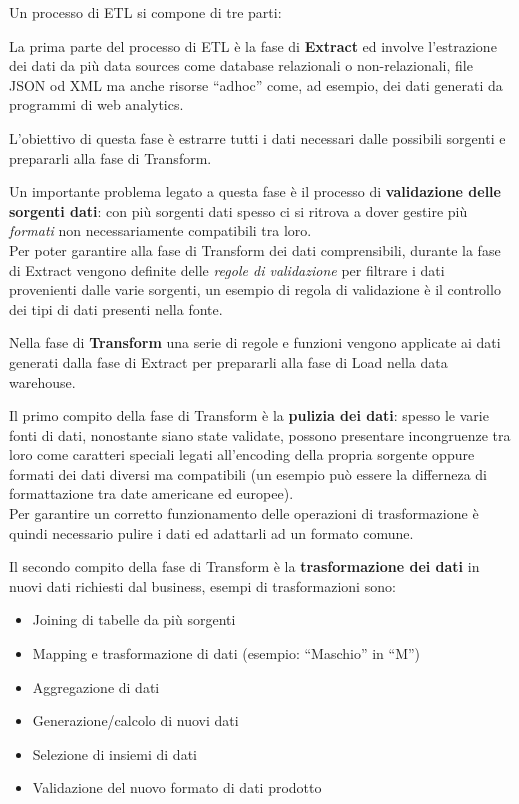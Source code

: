 \documentclass[]{article}
\providecommand{\tightlist}{%
  \setlength{\itemsep}{0pt}\setlength{\parskip}{0pt}}
\begin{document}
Un processo di ETL si compone di tre parti:

La prima parte del processo di ETL è la fase di \textbf{Extract} ed
involve l'estrazione dei dati da più data sources come database
relazionali o non-relazionali, file JSON od XML ma anche risorse
``adhoc'' come, ad esempio, dei dati generati da programmi di web
analytics.

L'obiettivo di questa fase è estrarre tutti i dati necessari dalle
possibili sorgenti e prepararli alla fase di Transform.

Un importante problema legato a questa fase è il processo di
\textbf{validazione delle sorgenti dati}: con più sorgenti dati spesso
ci si ritrova a dover gestire più \emph{formati} non necessariamente
compatibili tra loro.\\
Per poter garantire alla fase di Transform dei dati comprensibili,
durante la fase di Extract vengono definite delle \emph{regole di
validazione} per filtrare i dati provenienti dalle varie sorgenti, un
esempio di regola di validazione è il controllo dei tipi di dati
presenti nella fonte.

\newpage

Nella fase di \textbf{Transform} una serie di regole e funzioni vengono
applicate ai dati generati dalla fase di Extract per prepararli alla
fase di Load nella data warehouse.

Il primo compito della fase di Transform è la \textbf{pulizia dei dati}:
spesso le varie fonti di dati, nonostante siano state validate, possono
presentare incongruenze tra loro come caratteri speciali legati
all'encoding della propria sorgente oppure formati dei dati diversi ma
compatibili (un esempio può essere la differneza di formattazione tra
date americane ed europee).\\
Per garantire un corretto funzionamento delle operazioni di
trasformazione è quindi necessario pulire i dati ed adattarli ad un
formato comune.

Il secondo compito della fase di Transform è la \textbf{trasformazione
dei dati} in nuovi dati richiesti dal business, esempi di trasformazioni
sono:

\begin{itemize}
\tightlist
\item
  Joining di tabelle da più sorgenti
\item
  Mapping e trasformazione di dati (esempio: ``Maschio'' in ``M'')
\item
  Aggregazione di dati
\item
  Generazione/calcolo di nuovi dati
\item
  Selezione di insiemi di dati
\item
  Validazione del nuovo formato di dati prodotto
\end{itemize}
\end{document}

